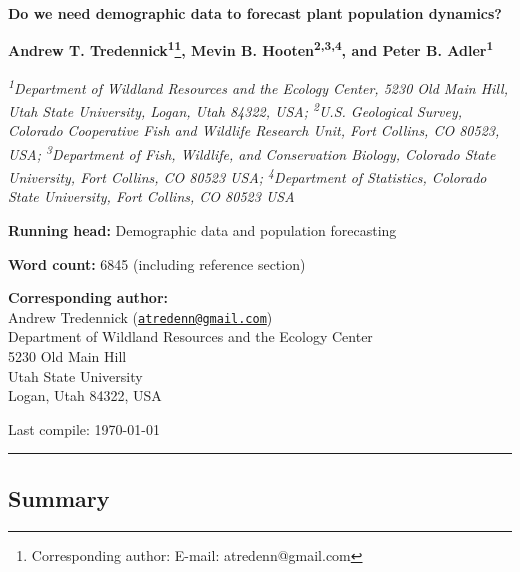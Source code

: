 \documentclass[12pt,]{article}
\title{}
\author{}
\date{}
\let\rmarkdownfootnote\footnote%
\def\footnote{\protect\rmarkdownfootnote}
\begin{document}
\maketitle


\textsf{\LARGE{\textbf{Do we need demographic data to forecast plant population dynamics?}}}

\renewcommand*{\thefootnote}{\fnsymbol{footnote}}

\vspace{1em}

\textsf{\normalsize{\textbf{Andrew T. Tredennick\textsuperscript{1}\footnote{Corresponding author: E-mail: atredenn@gmail.com}, Mevin B. Hooten\textsuperscript{2,3,4}, and Peter B. Adler\textsuperscript{1}}}}

\vspace{1em}

\textsf{\textit{\footnotesize{\textsuperscript{1}Department of Wildland Resources and the Ecology Center, 5230 Old Main Hill, Utah State University, Logan, Utah 84322, USA; \textsuperscript{2}U.S. Geological Survey, Colorado Cooperative Fish and Wildlife Research Unit, Fort Collins, CO 80523, USA; \textsuperscript{3}Department of Fish, Wildlife, and Conservation Biology, Colorado State University, Fort Collins, CO 80523 USA}; \textsuperscript{4}Department of Statistics, Colorado State University, Fort Collins, CO 80523 USA}}

\textbf{Running head:} Demographic data and population forecasting

\textbf{Word count:} 6845 (including reference section)

\textbf{Corresponding author:}\\Andrew Tredennick
(\href{mailto:atredenn@gmail.com}{\nolinkurl{atredenn@gmail.com}})\\Department
of Wildland Resources and the Ecology Center\\5230 Old Main Hill\\Utah
State University\\Logan, Utah 84322, USA

Last compile: \today

\allsectionsfont{\normalfont\sffamily\bfseries}
\renewcommand*{\thefootnote}{\arabic{footnote}} \setcounter{footnote}{0}

\rule{\textwidth}{1pt}

\subsection{Summary}\label{summary}
\end{document}
